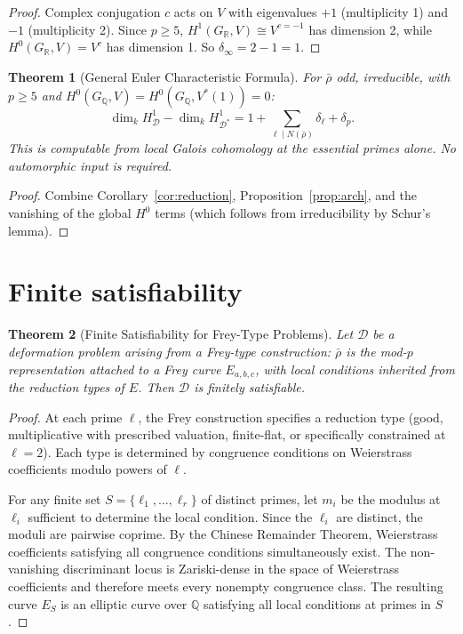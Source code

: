 \documentclass[12pt]{amsart}
\newtheorem{theorem}{Theorem}[section]
\theoremstyle{definition}
\theoremstyle{remark}
\newcommand{\rhobar}{\bar{\rho}}
\newcommand{\GQ}{G_{\mathbb{Q}}}
\begin{document}
\begin{proof}
Complex conjugation $c$ acts on $V$ with eigenvalues $+1$ (multiplicity 1) and $-1$ (multiplicity 2). Since $p \geq 5$, $H^1(G_\mathbb{R}, V) \cong V^{c = -1}$ has dimension 2, while $H^0(G_\mathbb{R}, V) = V^c$ has dimension 1. So $\delta_\infty = 2 - 1 = 1$.
\end{proof}

\begin{theorem}[General Euler Characteristic Formula]\label{thm:general-euler}
For $\rhobar$ odd, irreducible, with $p \geq 5$ and $H^0(\GQ, V) = H^0(\GQ, V^*(1)) = 0$:
\begin{equation}\label{eq:general-euler}
\dim_k H^1_{\mathcal{D}} - \dim_k H^1_{\mathcal{D}^*} = 1 + \sum_{\ell \mid N(\rhobar)} \delta_\ell + \delta_p.
\end{equation}
This is computable from local Galois cohomology at the essential primes alone. No automorphic input is required.
\end{theorem}

\begin{proof}
Combine Corollary~\ref{cor:reduction}, Proposition~\ref{prop:arch}, and the vanishing of the global $H^0$ terms (which follows from irreducibility by Schur's lemma).
\end{proof}

\section{Finite satisfiability}
\label{sec:fsat}

\begin{theorem}[Finite Satisfiability for Frey-Type Problems]\label{thm:fsat}
Let $\mathcal{D}$ be a deformation problem arising from a Frey-type construction: $\rhobar$ is the mod-$p$ representation attached to a Frey curve $E_{a,b,c}$, with local conditions inherited from the reduction types of $E$. Then $\mathcal{D}$ is finitely satisfiable.
\end{theorem}

\begin{proof}
At each prime $\ell$, the Frey construction specifies a reduction type (good, multiplicative with prescribed valuation, finite-flat, or specifically constrained at $\ell = 2$). Each type is determined by congruence conditions on Weierstrass coefficients modulo powers of $\ell$.

For any finite set $S = \{\ell_1, \ldots, \ell_r\}$ of distinct primes, let $m_i$ be the modulus at $\ell_i$ sufficient to determine the local condition. Since the $\ell_i$ are distinct, the moduli are pairwise coprime. By the Chinese Remainder Theorem, Weierstrass coefficients satisfying all congruence conditions simultaneously exist. The non-vanishing discriminant locus is Zariski-dense in the space of Weierstrass coefficients and therefore meets every nonempty congruence class. The resulting curve $E_S$ is an elliptic curve over $\mathbb{Q}$ satisfying all local conditions at primes in $S$.
\end{proof}
\end{document}
